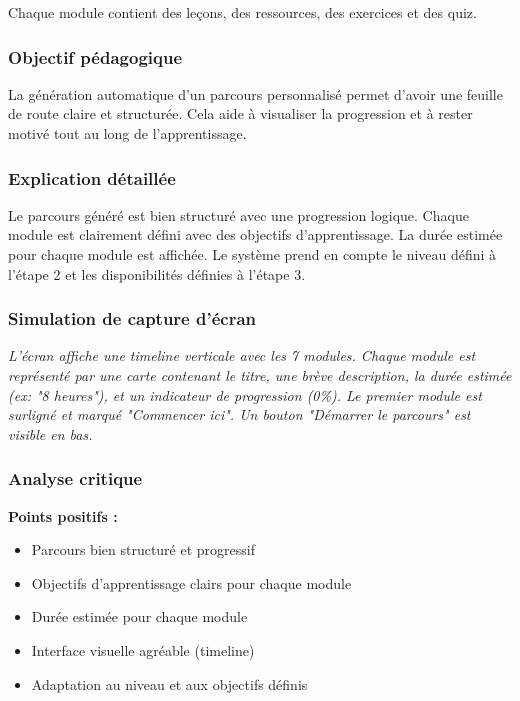 \documentclass[12pt,a4paper]{article}
\begin{document}
Chaque module contient des leçons, des ressources, des exercices et des quiz.

\subsubsection{Objectif pédagogique}

La génération automatique d'un parcours personnalisé permet d'avoir une feuille de route claire et structurée. Cela aide à visualiser la progression et à rester motivé tout au long de l'apprentissage.

\subsubsection{Explication détaillée}

Le parcours généré est bien structuré avec une progression logique. Chaque module est clairement défini avec des objectifs d'apprentissage. La durée estimée pour chaque module est affichée. Le système prend en compte le niveau défini à l'étape 2 et les disponibilités définies à l'étape 3.

\subsubsection{Simulation de capture d'écran}

\textit{L'écran affiche une timeline verticale avec les 7 modules. Chaque module est représenté par une carte contenant le titre, une brève description, la durée estimée (ex: "8 heures"), et un indicateur de progression (0\%). Le premier module est surligné et marqué "Commencer ici". Un bouton "Démarrer le parcours" est visible en bas.}

\subsubsection{Analyse critique}

\textbf{Points positifs :}
\begin{itemize}
    \item Parcours bien structuré et progressif
    \item Objectifs d'apprentissage clairs pour chaque module
    \item Durée estimée pour chaque module
    \item Interface visuelle agréable (timeline)
    \item Adaptation au niveau et aux objectifs définis
\end{itemize}
\end{document}
